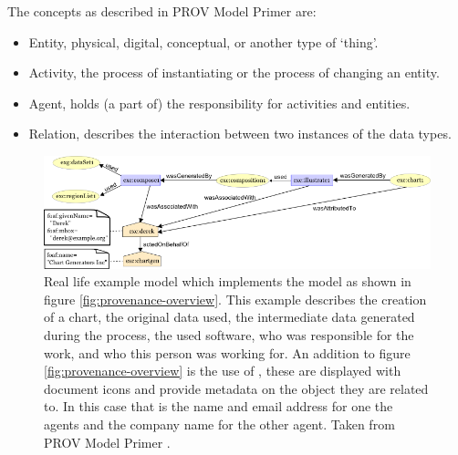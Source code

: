 The concepts as described in PROV Model Primer \cite{dsp8gil} are:

\begin{itemize}
	\item Entity, physical, digital, conceptual, or another type of `thing'.
	\item Activity, the process of instantiating or the process of changing an entity.
	\item Agent, holds (a part of) the responsibility for activities and entities.
	\item Relation, describes the interaction between two instances of the data types.
\end{itemize}

\begin{figure}[!b]
	\centering
	\includegraphics[width=1.0\linewidth]{images/provenance-large-schema}
	\caption{
		Real life example model which implements the model as shown in figure \ref{fig:provenance-overview}.
		This example describes the creation of a chart, the original data used, the intermediate data generated during the process, the used software, who was responsible for the work, and who this person was working for.
		An addition to figure \ref{fig:provenance-overview} is the use of \attributes{}, these are displayed with document icons and provide metadata on the object they are related to.
		In this case that is the name and email address for one the agents and the company name for the other agent.
		Taken from PROV Model Primer \cite{dsp8gil}.
		}
	\label{fig:provenance-large-schema}
\end{figure}


